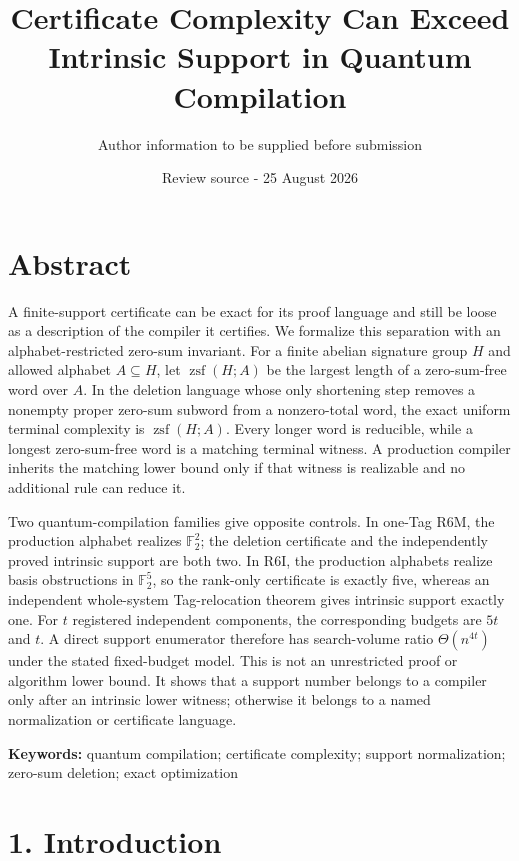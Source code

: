 \documentclass[
  11pt,
]{article}
\title{Certificate Complexity Can Exceed Intrinsic Support in Quantum Compilation}
\author{Author information to be supplied before submission}
\date{Review source - 25 August 2026}
\begin{document}
\maketitle

\hypertarget{abstract}{%
\section{Abstract}\label{abstract}}

A finite-support certificate can be exact for its proof language and
still be loose as a description of the compiler it certifies. We
formalize this separation with an alphabet-restricted zero-sum
invariant. For a finite abelian signature group \(H\) and allowed
alphabet \(A\subseteq H\), let \(\operatorname{zsf}(H; A)\) be the
largest length of a zero-sum-free word over \(A\). In the deletion
language whose only shortening step removes a nonempty proper zero-sum
subword from a nonzero-total word, the exact uniform terminal complexity
is \(\operatorname{zsf}(H; A)\). Every longer word is reducible, while a
longest zero-sum-free word is a matching terminal witness. A production
compiler inherits the matching lower bound only if that witness is
realizable and no additional rule can reduce it.

Two quantum-compilation families give opposite controls. In one-Tag R6M,
the production alphabet realizes \(\mathbb F_2^2\); the deletion
certificate and the independently proved intrinsic support are both two.
In R6I, the production alphabets realize basis obstructions in
\(\mathbb F_2^5\), so the rank-only certificate is exactly five, whereas
an independent whole-system Tag-relocation theorem gives intrinsic
support exactly one. For \(t\) registered independent components, the
corresponding budgets are \(5t\) and \(t\). A direct support enumerator
therefore has search-volume ratio \(\Theta(n^{4t})\) under the stated
fixed-budget model. This is not an unrestricted proof or algorithm lower
bound. It shows that a support number belongs to a compiler only after
an intrinsic lower witness; otherwise it belongs to a named
normalization or certificate language.

\textbf{Keywords:} quantum compilation; certificate complexity; support
normalization; zero-sum deletion; exact optimization

\hypertarget{introduction}{%
\section{1. Introduction}\label{introduction}}
\end{document}
